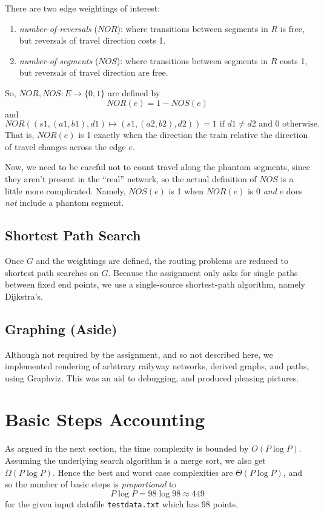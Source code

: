 \documentclass[11pt]{article}
\begin{document}
There are two edge weightings of interest:

\begin{enumerate}
\item \emph{number-of-reversals} ($NOR$): where transitions between segments in $R$ is
   free, but reversals of travel direction costs 1.
\item \emph{number-of-segments} ($NOS$): where transitions between segments in $R$
   costs 1, but reversals of travel direction are free.
\end{enumerate}
So, $NOR,NOS : E \to \{0,1\}$ are defined by
\[
  NOR(e) = 1 - NOS(e)
\]
and
\[
  NOR((s1,(a1,b1),d1) \mapsto (s1,(a2,b2),d2)) = 1 \text{ if } d1 \ne d2 \text{ and } 0 \text{ otherwise.}
\] That is, $NOR(e)$ is 1 exactly when the direction the train relative
the direction of travel changes across the edge $e$.

Now, we need to be careful not to count travel along the phantom
segments, since they aren't present in the ``real'' network, so the
actual definition of $NOS$ is a little more complicated.  Namely,
$NOS(e)$ is 1 when $NOR(e)$ is 0 \emph{and} $e$ does \emph{not} include a phantom
segment.

\subsection{Shortest Path Search}
\label{sec-2.3}


Once $G$ and the weightings are defined, the routing problems are
reduced to shortest path searches on $G$.  Because the assignment only
asks for single paths between fixed end points, we use a single-source
shortest-path algorithm, namely Dijkstra's.

\subsection{Graphing (Aside)}
\label{sec-2.4}


Although not required by the assignment, and so not described here, we
implemented rendering of arbitrary railyway networks, derived graphs,
and paths, using Graphviz.  This was an aid to debugging, and produced
pleasing pictures.

\section{Basic Steps Accounting}
\label{sec-3}


As argued in the next section, the time complexity is bounded by $O(P
\log P)$.  Assuming the underlying search algorithm is a merge sort,
we also get $\Omega(P \log P)$.  Hence the best and worst case
complexities are $\Theta(P \log P)$, and so the number of basic steps
is \emph{proportional} to
\[
P \log P = 98 \log 98 \approx 449
\] for the given input datafile \texttt{testdata.txt} which has 98 points.
\end{document}
